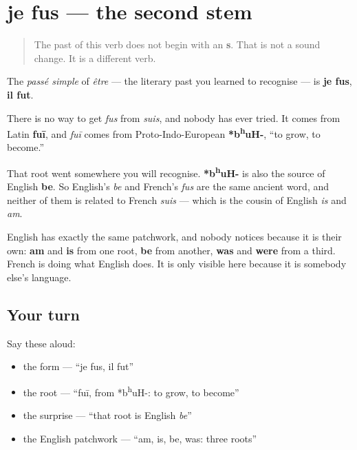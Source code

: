 \section[je fus]{je fus — the second stem}

\label{lesson:FR-C16-fu}



\begin{quote}
The past of this verb does not begin with an \textbf{s}. That is not a sound change. It is a different verb.
\end{quote}

\begin{cousinweb}
The \emph{passé simple} of \emph{être} — the literary past you learned to recognise — is \textbf{je fus}, \textbf{il fut}.

There is no way to get \emph{fus} from \emph{suis}, and nobody has ever tried. It comes from Latin \textbf{fuī}, and \emph{fuī} comes from Proto-Indo-European \textbf{*b\textsuperscript{h}uH-}, \textquotedblleft{}to grow, to become.\textquotedblright{}

That root went somewhere you will recognise. \textbf{*b\textsuperscript{h}uH-} is also the source of English \textbf{be}. So English's \emph{be} and French's \emph{fus} are the same ancient word, and neither of them is related to French \emph{suis} — which is the cousin of English \emph{is} and \emph{am}.

English has exactly the same patchwork, and nobody notices because it is their own: \textbf{am} and \textbf{is} from one root, \textbf{be} from another, \textbf{was} and \textbf{were} from a third. French is doing what English does. It is only visible here because it is somebody else's language.
\end{cousinweb}

\subsection*{Your turn}
Say these aloud:

\begin{itemize}
\raggedright
  \item the form — \textquotedblleft{}je fus, il fut\textquotedblright{}
  \item the root — \textquotedblleft{}fuī, from *b\textsuperscript{h}uH-: to grow, to become\textquotedblright{}
  \item the surprise — \textquotedblleft{}that root is English \emph{be}\textquotedblright{}
  \item the English patchwork — \textquotedblleft{}am, is, be, was: three roots\textquotedblright{}
\end{itemize}


